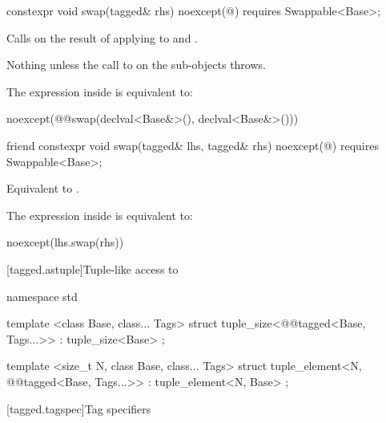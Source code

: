 {
\begin{itemdecl}
constexpr void swap(tagged& rhs) noexcept(@\seebelow@)
  requires Swappable<Base>;
\end{itemdecl}

\begin{itemdescr}
\pnum
\effects Calls  on the result of applying  to  and
.

\pnum
\throws Nothing unless the call to  on the  sub-objects throws.

\pnum
\remarks The expression inside  is equivalent to:

\begin{codeblock}
noexcept(@@swap(declval<Base&>(), declval<Base&>()))
\end{codeblock}
\end{itemdescr}

%
\begin{itemdecl}
friend constexpr void swap(tagged& lhs, tagged& rhs) noexcept(@\seebelow@)
  requires Swappable<Base>;
\end{itemdecl}

\begin{itemdescr}
\pnum
\effects Equivalent to .

\pnum
\remarks The expression inside  is equivalent to:

\begin{codeblock}
noexcept(lhs.swap(rhs))
\end{codeblock}
\end{itemdescr}

[tagged.astuple]{Tuple-like access to }

%
%
\begin{itemdecl}
namespace std {
  template <class Base, class... Tags>
  struct tuple_size<@@tagged<Base, Tags...>>
    : tuple_size<Base> { };

  template <size_t N, class Base, class... Tags>
  struct tuple_element<N, @@tagged<Base, Tags...>>
    : tuple_element<N, Base> { };
}
\end{itemdecl}

[tagged.tagspec]{Tag specifiers}

}
